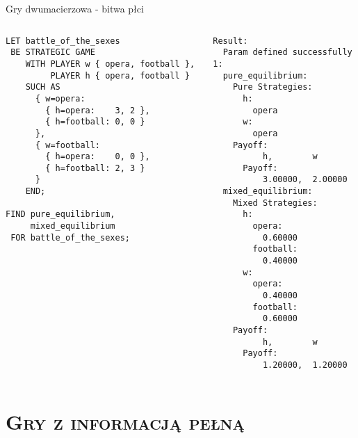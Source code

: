 \documentclass[xcolor=x11names,compress]{beamer}
\renewcommand{\(}{\begin{columns}}
\renewcommand{\)}{\end{columns}}
\newcommand{\<}[1]{\begin{column}{#1}}
\renewcommand{\>}{\end{column}}
\begin{document}
\begin{frame}[fragile]{Gry dwumacierzowa - bitwa płci}
\begin{columns}[c]
\begin{column}{.5\textwidth}
\begin{lstlisting}
LET battle_of_the_sexes
 BE STRATEGIC GAME
    WITH PLAYER w { opera, football },
         PLAYER h { opera, football }
    SUCH AS
      { w=opera:
        { h=opera:    3, 2 },
        { h=football: 0, 0 }
      },
      { w=football:
        { h=opera:    0, 0 },
        { h=football: 2, 3 }
      }
    END;
    
FIND pure_equilibrium,
     mixed_equilibrium
 FOR battle_of_the_sexes;
\end{lstlisting}
\end{column}
\vrule
\begin{column}{.5\textwidth}
\begin{lstlisting}
Result:
  Param defined successfully
1:
  pure_equilibrium:
    Pure Strategies:
      h:
        opera
      w:
        opera
    Payoff:
          h,        w
      Payoff:
          3.00000,  2.00000
  mixed_equilibrium:
    Mixed Strategies:
      h:
        opera:
          0.60000
        football:
          0.40000
      w:
        opera:
          0.40000
        football:
          0.60000
    Payoff:
          h,        w
      Payoff:
          1.20000,  1.20000
\end{lstlisting}
\end{column}
\end{columns}
\end{frame}


\section{\scshape Gry z informacją pełną}
\end{document}
